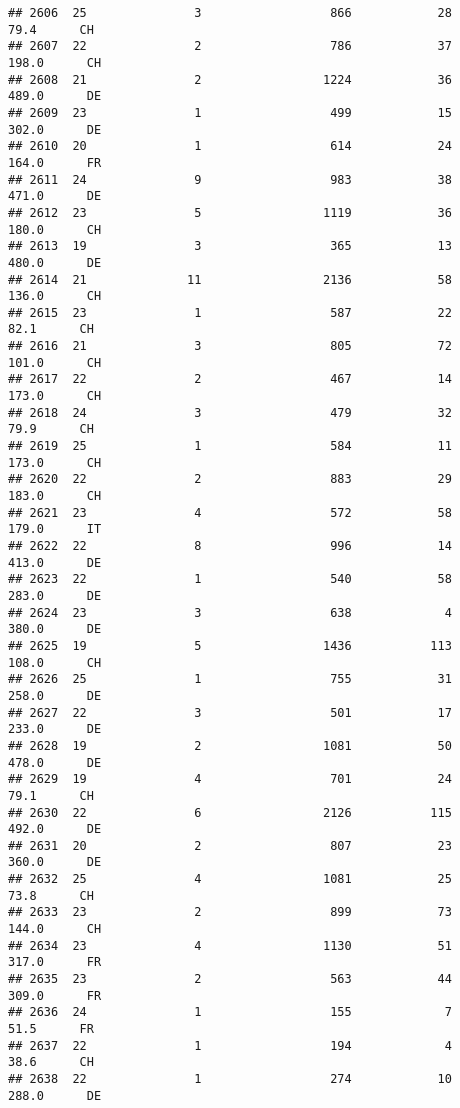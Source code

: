 \documentclass[
]{article}
\begin{document}
\begin{verbatim}
## 2606  25               3                  866            28     79.4      CH
## 2607  22               2                  786            37    198.0      CH
## 2608  21               2                 1224            36    489.0      DE
## 2609  23               1                  499            15    302.0      DE
## 2610  20               1                  614            24    164.0      FR
## 2611  24               9                  983            38    471.0      DE
## 2612  23               5                 1119            36    180.0      CH
## 2613  19               3                  365            13    480.0      DE
## 2614  21              11                 2136            58    136.0      CH
## 2615  23               1                  587            22     82.1      CH
## 2616  21               3                  805            72    101.0      CH
## 2617  22               2                  467            14    173.0      CH
## 2618  24               3                  479            32     79.9      CH
## 2619  25               1                  584            11    173.0      CH
## 2620  22               2                  883            29    183.0      CH
## 2621  23               4                  572            58    179.0      IT
## 2622  22               8                  996            14    413.0      DE
## 2623  22               1                  540            58    283.0      DE
## 2624  23               3                  638             4    380.0      DE
## 2625  19               5                 1436           113    108.0      CH
## 2626  25               1                  755            31    258.0      DE
## 2627  22               3                  501            17    233.0      DE
## 2628  19               2                 1081            50    478.0      DE
## 2629  19               4                  701            24     79.1      CH
## 2630  22               6                 2126           115    492.0      DE
## 2631  20               2                  807            23    360.0      DE
## 2632  25               4                 1081            25     73.8      CH
## 2633  23               2                  899            73    144.0      CH
## 2634  23               4                 1130            51    317.0      FR
## 2635  23               2                  563            44    309.0      FR
## 2636  24               1                  155             7     51.5      FR
## 2637  22               1                  194             4     38.6      CH
## 2638  22               1                  274            10    288.0      DE

\end{verbatim}
\end{document}
